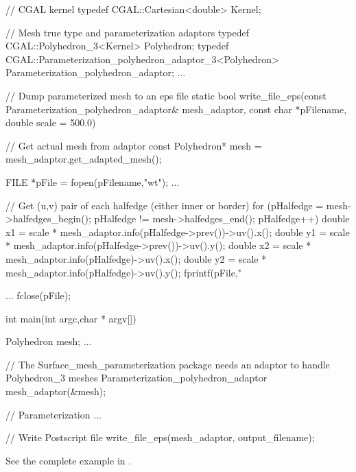 \begin{ccExampleCode}

// CGAL kernel
typedef CGAL::Cartesian<double>                         Kernel;

// Mesh true type and parameterization adaptors
typedef CGAL::Polyhedron_3<Kernel>                      Polyhedron;
typedef CGAL::Parameterization_polyhedron_adaptor_3<Polyhedron>     
                                                        Parameterization_polyhedron_adaptor;
...

// Dump parameterized mesh to an eps file
static bool write_file_eps(const Parameterization_polyhedron_adaptor& mesh_adaptor,
                           const char *pFilename,
                           double scale = 500.0)
{
    // Get actual mesh from adaptor
    const Polyhedron* mesh = mesh_adaptor.get_adapted_mesh();

    FILE *pFile = fopen(pFilename,"wt");
    ...

    // Get (u,v) pair of each halfedge (either inner or border)
    for (pHalfedge = mesh->halfedges_begin();
         pHalfedge != mesh->halfedges_end();
         pHalfedge++)
    {
        double x1 = scale * mesh_adaptor.info(pHalfedge->prev())->uv().x();
        double y1 = scale * mesh_adaptor.info(pHalfedge->prev())->uv().y();
        double x2 = scale * mesh_adaptor.info(pHalfedge)->uv().x();
        double y2 = scale * mesh_adaptor.info(pHalfedge)->uv().y();
        fprintf(pFile,"%
    }

    ...
    fclose(pFile);
}

int main(int argc,char * argv[])
{
    Polyhedron mesh;
    ...

    // The Surface_mesh_parameterization package needs an adaptor to handle Polyhedron_3 meshes
    Parameterization_polyhedron_adaptor mesh_adaptor(&mesh);

    // Parameterization
    ...

    // Write Postscript file
    write_file_eps(mesh_adaptor, output_filename);
}

\end{ccExampleCode}

See the complete example in .